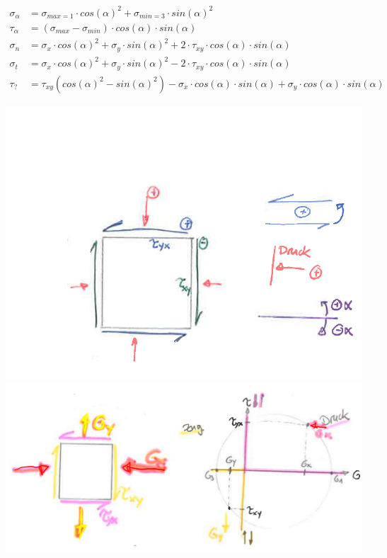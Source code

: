 \begin{minipage}{0.7\linewidth}
	\begin{align*}
		\sigma_\alpha	&=\sigma_{max=1} \cdot cos(\alpha)^2 + \sigma_{min=3} \cdot sin(\alpha)^2 \\
		\tau_\alpha		&= (\sigma_{max} -\sigma_{min}) \cdot cos(\alpha) \cdot sin(\alpha) \\
		\sigma_n		&= \sigma_x \cdot cos(\alpha)^2 + \sigma_y \cdot sin(\alpha)^2 + 2 \cdot \tau_{xy} \cdot cos(\alpha) \cdot sin(\alpha) \\
		\sigma_t		&= \sigma_x \cdot cos(\alpha)^2 + \sigma_y \cdot sin(\alpha)^2 - 2 \cdot \tau_{xy} \cdot cos(\alpha) \cdot sin(\alpha) \\
		\tau_?			&= \tau_{xy} (cos(\alpha)^2 - sin(\alpha)^2) - \sigma_x \cdot cos(\alpha) \cdot sin(\alpha) + \sigma_y \cdot cos(\alpha) \cdot sin(\alpha)
	\end{align*}
\end{minipage}
\begin{minipage}{0.5\linewidth}
	\includegraphics[width=0.5\linewidth]{images/Mohrsch1Vorzeichen.PNG} \\
	\includegraphics[width=0.65\linewidth]{images/Mohrsch2Bsp.PNG}
\end{minipage}

